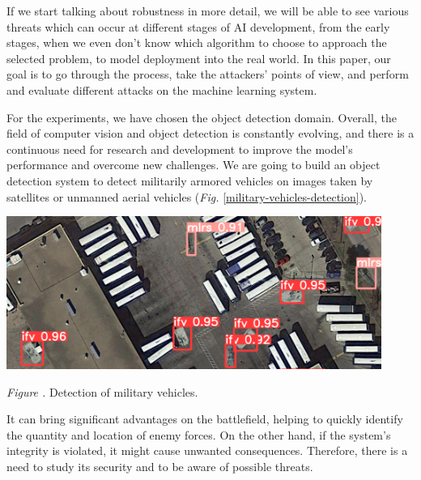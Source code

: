 \documentclass[14pt,a4paper]{extarticle}
\newcounter{e}
\newcounter{pic}
\newcommand{\pic}[1]{\refstepcounter{pic} \vspace{-0.3cm}\textit{Figure \arabic{pic}\label{#1}.}}
\numberwithin{equation}{section}
\numberwithin{figure}{section}
\begin{document}
If we start talking about robustness in more detail, we will be able to see various threats which can occur at different stages of AI development, from the early stages, when we even don't know which algorithm to choose to approach the selected problem, to model deployment into the real world. In this paper, our goal is to go through the process, take the attackers' points of view, and perform and evaluate different attacks on the machine learning system.

For the experiments, we have chosen the object detection domain. Overall, the field of computer vision and object detection is constantly evolving, and there is a continuous need for research and development to improve the model's performance and overcome new challenges. We are going to build an object detection system to detect militarily armored vehicles on images taken by satellites or unmanned aerial vehicles (\textit{Fig.} \ref{military-vehicles-detection}). 

\begin{center}
    \includegraphics[height=5cm]{images/vehicles-detection.png}
\end{center}
\begin{center}
    \pic{military-vehicles-detection} Detection of military vehicles.
\end{center}
It can bring significant advantages on the battlefield, helping to quickly identify the quantity and location of enemy forces. On the other hand, if the system’s integrity is violated, it might cause unwanted consequences. Therefore, there is a need to study its security and to be aware of possible threats.
\end{document}
